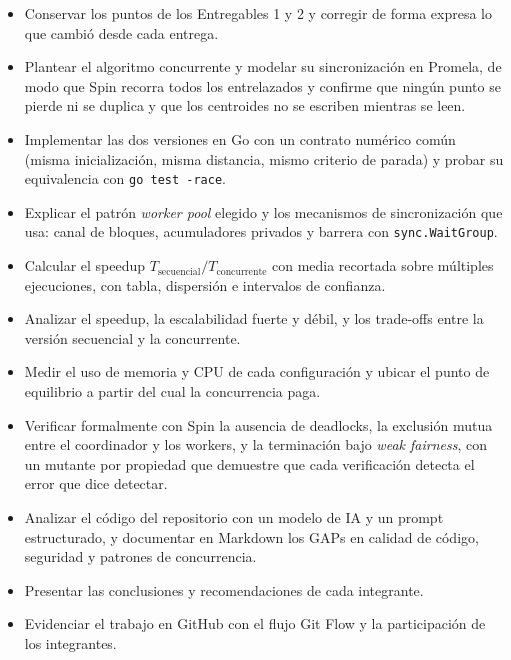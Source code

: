 \begin{itemize}
  \item Conservar los puntos de los Entregables 1 y 2 y corregir de forma expresa lo que cambió
        desde cada entrega.
  \item Plantear el algoritmo concurrente y modelar su sincronización en Promela, de modo que Spin
        recorra todos los entrelazados y confirme que ningún punto se pierde ni se duplica y que los
        centroides no se escriben mientras se leen.
  \item Implementar las dos versiones en Go con un contrato numérico común (misma inicialización,
        misma distancia, mismo criterio de parada) y probar su equivalencia con \texttt{go test -race}.
  \item Explicar el patrón \emph{worker pool} elegido y los mecanismos de sincronización que usa:
        canal de bloques, acumuladores privados y barrera con \texttt{sync.WaitGroup}.
  \item Calcular el speedup $T_{\text{secuencial}} / T_{\text{concurrente}}$ con media recortada
        sobre múltiples ejecuciones, con tabla, dispersión e intervalos de confianza.
  \item Analizar el speedup, la escalabilidad fuerte y débil, y los trade-offs entre la versión
        secuencial y la concurrente.
  \item Medir el uso de memoria y CPU de cada configuración y ubicar el punto de equilibrio a partir
        del cual la concurrencia paga.
  \item Verificar formalmente con Spin la ausencia de deadlocks, la exclusión mutua entre el
        coordinador y los workers, y la terminación bajo \emph{weak fairness}, con un mutante por
        propiedad que demuestre que cada verificación detecta el error que dice detectar.
  \item Analizar el código del repositorio con un modelo de IA y un prompt estructurado, y
        documentar en Markdown los GAPs en calidad de código, seguridad y patrones de concurrencia.
  \item Presentar las conclusiones y recomendaciones de cada integrante.
  \item Evidenciar el trabajo en GitHub con el flujo Git Flow y la participación de los integrantes.
\end{itemize}
